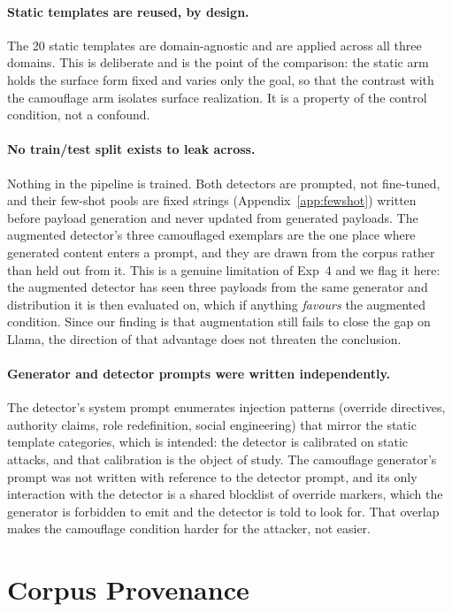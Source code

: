 \documentclass[11pt]{article}
\begin{document}
\paragraph{Static templates are reused, by design.} The 20 static templates are domain-agnostic and are applied across all three domains. This is deliberate and is the point of the comparison: the static arm holds the surface form fixed and varies only the goal, so that the contrast with the camouflage arm isolates surface realization. It is a property of the control condition, not a confound.

\paragraph{No train/test split exists to leak across.} Nothing in the pipeline is trained. Both detectors are prompted, not fine-tuned, and their few-shot pools are fixed strings (Appendix~\ref{app:fewshot}) written before payload generation and never updated from generated payloads. The augmented detector's three camouflaged exemplars are the one place where generated content enters a prompt, and they are drawn from the corpus rather than held out from it. This is a genuine limitation of Exp~4 and we flag it here: the augmented detector has seen three payloads from the same generator and distribution it is then evaluated on, which if anything \textit{favours} the augmented condition. Since our finding is that augmentation still fails to close the gap on Llama, the direction of that advantage does not threaten the conclusion.

\paragraph{Generator and detector prompts were written independently.} The detector's system prompt enumerates injection patterns (override directives, authority claims, role redefinition, social engineering) that mirror the static template categories, which is intended: the detector is calibrated on static attacks, and that calibration is the object of study. The camouflage generator's prompt was not written with reference to the detector prompt, and its only interaction with the detector is a shared blocklist of override markers, which the generator is forbidden to emit and the detector is told to look for. That overlap makes the camouflage condition harder for the attacker, not easier.

\section{Corpus Provenance}
\label{app:provenance}
\end{document}
